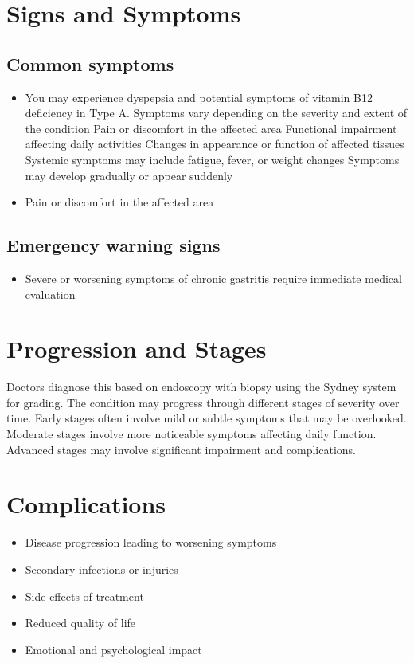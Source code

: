 \section{Signs and Symptoms}

\subsection{Common symptoms}
\begin{itemize}[noitemsep]
  \item You may experience dyspepsia and potential symptoms of vitamin B12 deficiency in Type A. Symptoms vary depending on the severity and extent of the condition Pain or discomfort in the affected area Functional impairment affecting daily activities Changes in appearance or function of affected tissues Systemic symptoms may include fatigue, fever, or weight changes Symptoms may develop gradually or appear suddenly
  \item Pain or discomfort in the affected area
  \end{itemize}

\subsection{Emergency warning signs}
\begin{itemize}[noitemsep]
  \item Severe or worsening symptoms of chronic gastritis require immediate medical evaluation
\end{itemize}
\section{Progression and Stages}
Doctors diagnose this based on endoscopy with biopsy using the Sydney system for grading. The condition may progress through different stages of severity over time. Early stages often involve mild or subtle symptoms that may be overlooked. Moderate stages involve more noticeable symptoms affecting daily function. Advanced stages may involve significant impairment and complications.
\section{Complications}
\begin{itemize}[noitemsep]
  \item Disease progression leading to worsening symptoms
  \item Secondary infections or injuries
  \item Side effects of treatment
  \item Reduced quality of life
  \item Emotional and psychological impact
\end{itemize}
